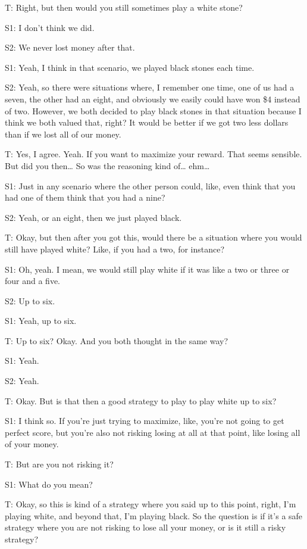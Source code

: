 \documentclass[a4paper,superscriptaddress,nofootinbib]{revtex4}
\begin{document}
T: Right, but then would you still sometimes play a white stone? 

S1: I don't think we did.

S2: We never lost money after that. 

S1: Yeah, I think in that scenario, we played black stones each time.

S2: Yeah, so there were situations where, I remember one time, one of us had a seven, the other had an eight, and obviously we easily could have won \$4 instead of two. However, we both decided to play black stones in that situation because I think we both valued that, right? It would be better if we got two less dollars than if we lost all of our money. 

T: Yes, I agree. Yeah. If you want to maximize your reward. That seems sensible. But did you then… So was the reasoning kind of… ehm… 

S1: Just in any scenario where the other person could, like, even think that you had one of them think that you had a nine? 

S2: Yeah, or an eight, then we just played black. 

T: Okay, but then after you got this, would there be a situation where you would still have played white? Like, if you had a two, for instance? 

S1: Oh, yeah. I mean, we would still play white if it was like a two or three or four and a five.

S2: Up to six. 

S1: Yeah, up to six. 

T: Up to six? Okay. And you both thought in the same way?

S1: Yeah. 

S2: Yeah.

T: Okay. But is that then a good strategy to play to play white up to six? 

S1: I think so. If you're just trying to maximize, like, you're not going to get perfect score, but you're also not risking losing at all at that point, like losing all of your money.

T: But are you not risking it? 

S1: What do you mean? 

T: Okay, so this is kind of a strategy where you said up to this point, right, I'm playing white, and beyond that, I'm playing black. So the question is if it’s a safe strategy where you are not risking to lose all your money, or is it still a risky strategy? 
\end{document}
